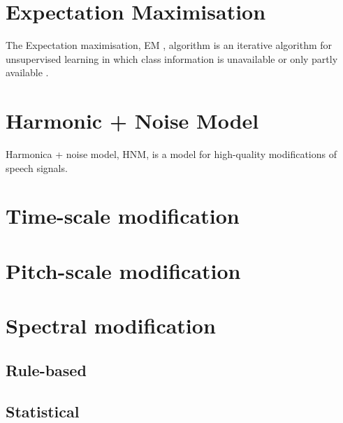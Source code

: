 \section{Expectation Maximisation} %
\label{sec:expectation_maximisation}
The Expectation maximisation, EM , algorithm is an iterative algorithm for unsupervised learning in which class information is unavailable or only partly available \cite{taletek}.

\section{Harmonic + Noise Model} %
\label{sec:harmonic_noise_model}
Harmonica + noise model, HNM, is a model for high-quality modifications of speech signals.

\section{Time-scale modification} %
\label{sec:time_scale_modification}


\section{Pitch-scale modification} %
\label{sec:pitch_scale_modification}


\section{Spectral modification} %
\label{sec:spectral_modification}

\subsection{Rule-based} %
\label{sub:rule_based}


\subsection{Statistical} %
\label{sub:statistical}

